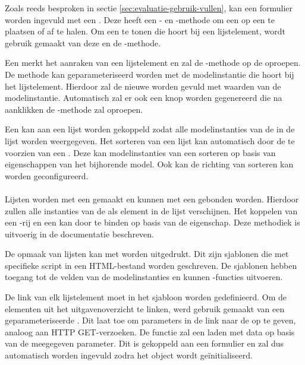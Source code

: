 Zoals reeds besproken in sectie \ref{sec:evaluatie-gebruik-vullen}, kan een formulier worden ingevuld met een .
Deze  heeft een - en -methode om een  op een  te plaatsen of af te halen.
Om een  te tonen die hoort bij een lijstelement, wordt gebruik gemaakt van deze  en de -methode.

Een  merkt het aanraken van een lijstelement en zal de -methode op de  oproepen.
De methode kan geparameteriseerd worden met de modelinstantie die hoort bij het lijstelement.
Hierdoor zal de nieuwe  worden gevuld met waarden van de modelinstantie.
Automatisch zal er ook een  knop worden gegenereerd die na aanklikken de -methode zal oproepen.

Een  kan aan een lijst worden gekoppeld zodat alle modelinstanties van de  in de lijst worden weergegeven.
Het sorteren van een lijst kan automatisch door de  te voorzien van een .
Deze kan modelinstanties van een  sorteren op basis van eigenschappen van het bijhorende model.
Ook kan de richting van sorteren kan worden geconfigureerd.

\paragraph{\kendo}
Lijsten worden met een  gemaakt en kunnen met een  gebonden worden.
Hierdoor zullen alle instanties van de  als element in de lijst verschijnen.
Het koppelen van een \js-rij en een  kan door te binden op basis van de  eigenschap.
Deze methodiek is uitvoerig in de documentatie beschreven.

De opmaak van lijsten kan met  worden uitgedrukt.
Dit zijn sjablonen die met specifieke script in een HTML-bestand worden geschreven.
De sjablonen hebben toegang tot de velden van de modelinstanties en kunnen \js-functies uitvoeren.

De link van elk lijstelement moet in het sjabloon worden gedefinieerd.
Om de elementen uit het uitgavenoverzicht te linken, werd gebruik gemaakt van een geparameteriseerde .
Dit laat toe om parameters in de link naar de  op te geven,  analoog aan HTTP GET-verzoeken.
De functie zal een  laden met data op basis van de meegegeven parameter.
Dit  is gekoppeld aan een formulier en zal dus automatisch worden ingevuld zodra het object wordt geïnitialiseerd.

